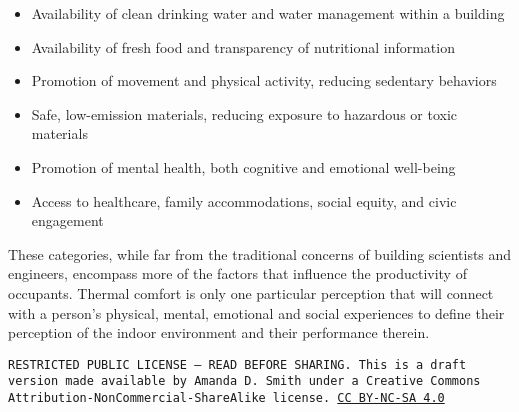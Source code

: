 \documentclass[10pt]{article}
\begin{document}
\vspace{-6pt}
\begin{itemize}
    \setlength{\itemsep}{0pt}%
    \setlength{\parskip}{0pt}%
    \item Availability of clean drinking water and water management within a building
    \item Availability of fresh food and transparency of nutritional information
    \item Promotion of movement and physical activity, reducing sedentary behaviors
    \item Safe, low-emission materials, reducing exposure to hazardous or toxic materials
    \item Promotion of mental health, both cognitive and emotional well-being
    \item Access to healthcare, family accommodations, social equity, and civic engagement
\end{itemize}

These categories, while far from the traditional concerns of building scientists and engineers, encompass more of the factors that influence the productivity of occupants. Thermal comfort is only one particular perception that will connect with a person's physical, mental, emotional and social experiences to define their perception of the indoor environment and their performance therein.

\bigskip

\noindent
\texttt{\footnotesize RESTRICTED PUBLIC LICENSE --- READ BEFORE SHARING. This is a draft version made available by Amanda D. Smith under a Creative Commons Attribution-NonCommercial-ShareAlike license. 
\href{https://creativecommons.org/licenses/by-nc-sa/4.0/}{CC BY-NC-SA 4.0}}

\newpage
\printbibliography
\end{document}
